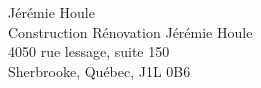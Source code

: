 Jérémie Houle\\Construction Rénovation Jérémie Houle\\4050 rue lessage, suite 150\\Sherbrooke, Québec, J1L 0B6\\